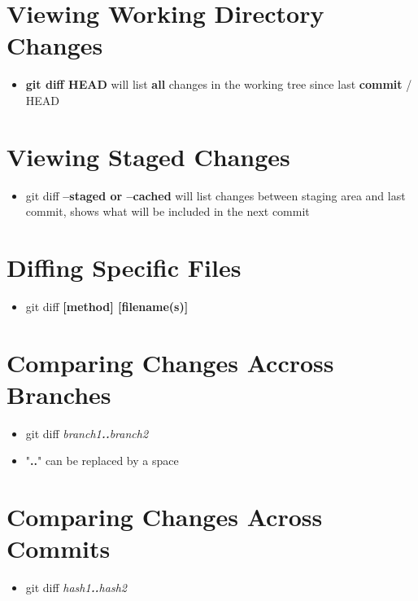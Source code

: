 \documentclass{report}
\begin{document}
\section{Viewing Working Directory Changes}

\begin{itemize}
	\item \textbf{git diff HEAD} will list \textbf{all} changes in the working tree since last \textbf{commit} / HEAD
\end{itemize}


\section{Viewing Staged Changes}

\begin{itemize}
	\item git diff \textbf{--staged or --cached} will list changes between staging area and last commit, shows what will be included in the next commit 
\end{itemize}


\section{Diffing Specific Files}

\begin{itemize}
	\item git diff \textbf{[method] [filename(s)]} 
\end{itemize}


\section{Comparing Changes Accross Branches}

\begin{itemize}
	\item git diff \textit{branch1\textbf{..}branch2} 
	\item "\textbf{..}" can be replaced by a space
\end{itemize}


\section{Comparing Changes Across Commits}

\begin{itemize}
	\item git diff \textit{hash1\textbf{..}hash2} 
\end{itemize}
\end{document}
